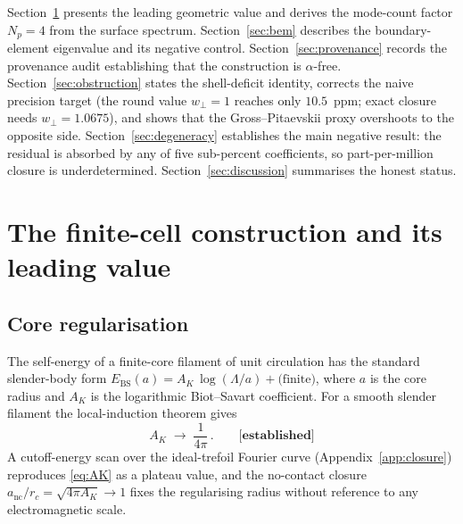 \documentclass[11pt,a4paper]{article}
\theoremstyle{definition}
\newcommand{\established}{\textbf{[established]}}
\begin{document}
Section~\ref{sec:leading} presents the leading geometric value and derives the
mode-count factor $N_p=4$ from the surface spectrum. Section~\ref{sec:bem}
describes the boundary-element eigenvalue and its negative control.
Section~\ref{sec:provenance} records the provenance audit establishing that the
construction is $\alpha$-free. Section~\ref{sec:obstruction} states the
shell-deficit identity, corrects the naive precision target (the round value
$w_\perp=1$ reaches only $10.5$~ppm; exact closure needs $w_\perp=1.0675$), and
shows that the Gross--Pitaevskii proxy overshoots to the opposite side.
Section~\ref{sec:degeneracy} establishes the main negative result: the residual is
absorbed by any of five sub-percent coefficients, so part-per-million closure is
underdetermined. Section~\ref{sec:discussion} summarises the honest status.

\section{The finite-cell construction and its leading value}
\label{sec:leading}

\subsection*{Core regularisation}
The self-energy of a finite-core filament of unit circulation has the standard
slender-body form $E_{\mathrm{BS}}(a)=A_K\,\log(\Lambda/a)+\text{(finite)}$,
where $a$ is the core radius and $A_K$ is the logarithmic Biot--Savart
coefficient. For a smooth slender filament the local-induction theorem gives
\begin{equation}
  A_K \;\longrightarrow\; \frac{1}{4\pi}\,. \qquad \established
  \label{eq:AK}
\end{equation}
A cutoff-energy scan over the ideal-trefoil Fourier curve (Appendix~\ref{app:closure})
reproduces \eqref{eq:AK} as a plateau value, and the no-contact closure
$a_{\mathrm{nc}}/r_c=\sqrt{4\pi A_K}\to 1$ fixes the regularising radius without
reference to any electromagnetic scale.
\end{document}

